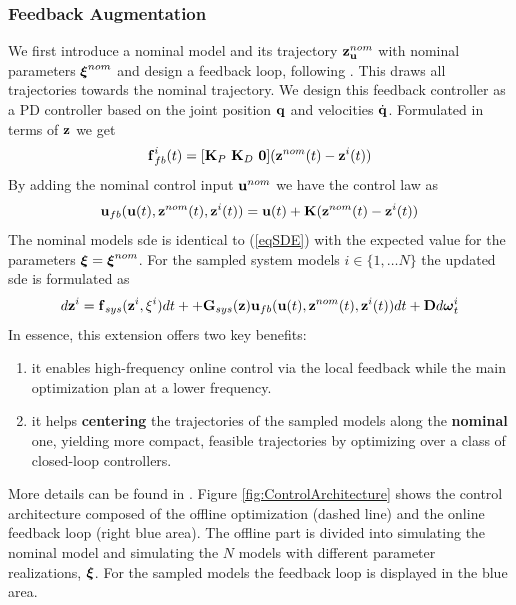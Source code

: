 \documentclass[a4paper,11pt]{article}
\newcommand{\Mat}[1]{\mathbf{\MakeUppercase{#1}}}
\renewcommand{\vec}[1]{\boldsymbol{\mathbf{\MakeLowercase{#1}}}}
\begin{document}
\subsubsection{Feedback Augmentation}
We first introduce a nominal model and its trajectory $\vec{z}_{\vec{u}}^{nom}$ with nominal parameters $\vec{\xi}^{nom}$ and design a feedback loop, following \cite{origane2025risk}. This draws all trajectories towards the nominal trajectory. We design this feedback controller as a PD controller based on the joint position $\vec q$ and velocities $\dot{\vec{q}}$. Formulated in terms of $\vec z$ we get
\begin{equation}
	\vec{f}_{fb}^i(t) = {\left[\Mat{K}_P ~ \Mat{K}_D ~ \Mat{0} \right]} (\vec{z}^{nom}(t) - \vec{z}^i(t))
\end{equation}
By adding the nominal control input $\vec{u}^{nom}$ we have the control law as
\begin{equation}
	\vec{u}_{fb}(\vec{u}(t), \vec{z}^{nom}(t), \vec{z}^i(t)) = \vec{u}(t) + \Mat{K} (\vec{z}^{nom}(t) - \vec{z}^i(t))
\end{equation}
The nominal models \gls{sde} is identical to (\ref{eqSDE}) with the expected value for the parameters $\vec{\xi} = \vec{\xi}^{nom}$. For the sampled system models $i \in \{1, \dots N\}$ the updated \gls{sde} is formulated as
\begin{equation}
    	d\vec{z}^i = \vec{f}_{sys}(\vec z^i, \xi^i) dt + 
	+ \Mat{G}_{sys}(\vec{z}) \vec{u}_{fb}(\vec{u}(t), \vec{z}^{nom}(t), \vec{z}^i(t)) dt + \Mat{D} d \vec{\omega}_t^i
\end{equation}
 In essence, this extension offers two key benefits:
\begin{enumerate}
    \item it enables high-frequency online control via the local feedback while the main optimization plan at a lower frequency.
    \item it helps \textbf{centering} the trajectories of the sampled models along the \textbf{nominal} one, yielding more compact, feasible trajectories by optimizing over a
class of closed-loop controllers.
\end{enumerate}
More details can be found in \cite{origane2025risk}. Figure \ref{fig:ControlArchitecture} shows the control architecture composed of the offline optimization (dashed line) and the online feedback loop (right blue area). The offline part is divided into simulating the nominal model and simulating the $N$ models with different parameter realizations, $\vec{\xi}$. For the sampled models the feedback loop is displayed in the blue area.
\end{document}
